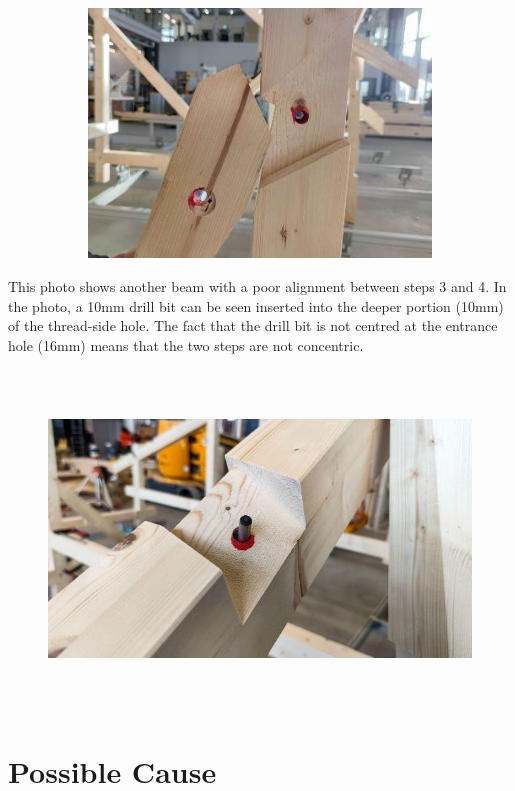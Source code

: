 \documentclass[11pt]{book}
\begin{document}
\begin{figure}[H]
\begin{subfigure}[b]{0.45\textwidth}
\includegraphics[width=\textwidth]{./images/image88.jpeg}
\end{subfigure}
\end{figure}


This photo shows another beam with a poor alignment between steps 3 and 4. In the photo, a 10mm drill bit can be seen inserted into the deeper portion (10mm) of the thread-side hole. The fact that the drill bit is not centred at the entrance hole (16mm) means that the two steps are not concentric.

\begin{figure}[H]
\includegraphics[width=15.92cm,height=8.96cm]{./images/image89.jpeg}
\end{figure}


\section{Possible Cause}
\end{document}

